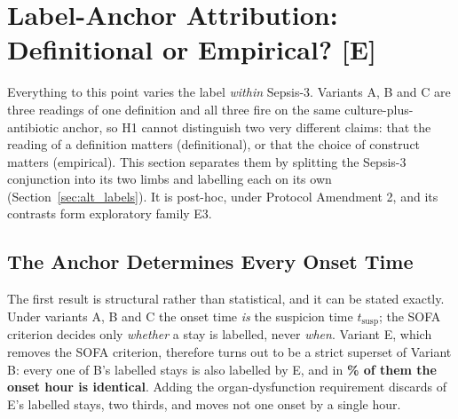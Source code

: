 

\section{Label-Anchor Attribution: Definitional or Empirical?
\texorpdfstring{[E]}{[E]}}
\label{sec:label_anchor_results}

Everything to this point varies the label \emph{within} Sepsis-3. Variants A, B
and C are three readings of one definition and all three fire on the same
culture-plus-antibiotic anchor, so H1 cannot distinguish two very different
claims: that the reading of a definition matters (definitional), or that the
choice of construct matters (empirical). This section separates them by
splitting the Sepsis-3 conjunction into its two limbs and labelling each on its
own (Section~\ref{sec:alt_labels}). It is post-hoc, under Protocol
Amendment 2, and its contrasts form exploratory family E3.

\subsection{The Anchor Determines Every Onset Time}

The first result is structural rather than statistical, and it can be stated
exactly. Under variants A, B and C the onset time \emph{is} the suspicion time
$t_{\text{susp}}$; the SOFA criterion decides only \emph{whether} a stay is
labelled, never \emph{when}. Variant E, which removes the SOFA criterion,
therefore turns out to be a strict superset of Variant B: every one of B's
\pcNPositiveBPanel{} labelled stays is also labelled by E, and in
\textbf{\pcPctExactMatchE\% of them the onset hour is identical}. Adding the
organ-dysfunction requirement discards \pcNPositiveEExcessOverB{} of E's
\pcNPositiveE{} labelled stays, two thirds, and moves not one onset
by a single hour.

